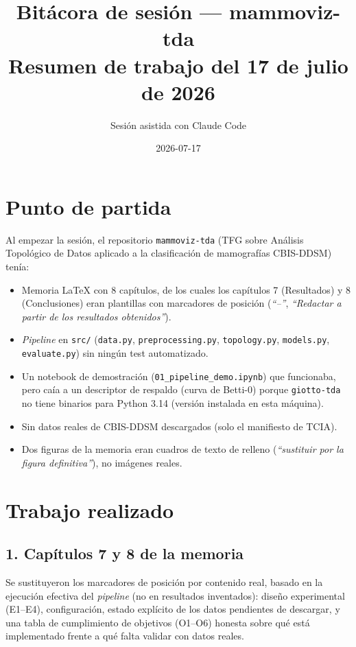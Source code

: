 \documentclass[11pt,a4paper]{article}
\title{Bitácora de sesión --- mammoviz-tda\\\large Resumen de trabajo del 17 de julio de 2026}
\author{Sesión asistida con Claude Code}
\date{2026-07-17}
\begin{document}
\maketitle

\section*{Punto de partida}
Al empezar la sesión, el repositorio \texttt{mammoviz-tda} (TFG sobre Análisis
Topológico de Datos aplicado a la clasificación de mamografías CBIS-DDSM)
tenía:
\begin{itemize}[nosep]
  \item Memoria LaTeX con 8 capítulos, de los cuales los capítulos 7
        (Resultados) y 8 (Conclusiones) eran plantillas con marcadores de
        posición (\textit{``--''}, \textit{``Redactar a partir de los
        resultados obtenidos''}).
  \item \textit{Pipeline} en \texttt{src/} (\texttt{data.py},
        \texttt{preprocessing.py}, \texttt{topology.py}, \texttt{models.py},
        \texttt{evaluate.py}) sin ningún test automatizado.
  \item Un notebook de demostración (\texttt{01\_pipeline\_demo.ipynb}) que
        funcionaba, pero caía a un descriptor de respaldo (curva de Betti-0)
        porque \texttt{giotto-tda} no tiene binarios para Python 3.14 (versión
        instalada en esta máquina).
  \item Sin datos reales de CBIS-DDSM descargados (solo el manifiesto de TCIA).
  \item Dos figuras de la memoria eran cuadros de texto de relleno
        (\textit{``sustituir por la figura definitiva''}), no imágenes reales.
\end{itemize}

\section*{Trabajo realizado}

\subsection*{1. Capítulos 7 y 8 de la memoria}
Se sustituyeron los marcadores de posición por contenido real, basado en la
ejecución efectiva del \textit{pipeline} (no en resultados inventados):
diseño experimental (E1--E4), configuración, estado explícito de los datos
pendientes de descargar, y una tabla de cumplimiento de objetivos (O1--O6)
honesta sobre qué está implementado frente a qué falta validar con datos
reales.
\end{document}
